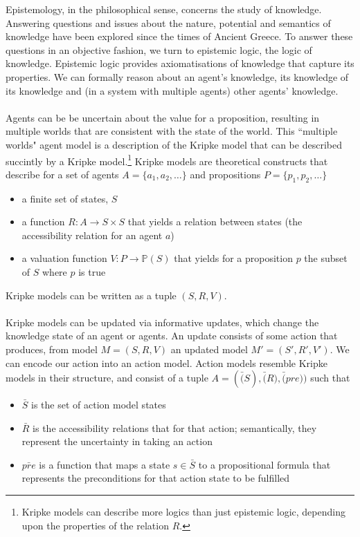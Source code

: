 \documentclass[12pt, a4paper]{article}
\begin{document}
Epistemology, in the philosophical sense, concerns the study of knowledge.
Answering questions and issues about the nature, potential and semantics of knowledge have been explored since the times of Ancient Greece.
To answer these questions in an objective fashion, we turn to epistemic logic, the logic of knowledge.
Epistemic logic provides axiomatisations of knowledge that capture its properties.
We can formally reason about an agent's knowledge, its knowledge of its knowledge and (in a system with multiple agents) other agents' knowledge.\\
\\
Agents can be be uncertain about the value for a proposition, resulting in multiple worlds that are consistent with the state of the world.
This ``multiple worlds" agent model is a description of the Kripke model that can be described succintly by a Kripke model.\footnote{Kripke models can describe more logics than just epistemic logic, depending upon the properties of the relation $R$.}
Kripke models are theoretical constructs that describe for a set of agents $A = \{a_1, a_2, \ldots\}$ and propositions $P = \{p_1, p_2, \ldots \}$
\begin{itemize}
  \item a finite set of states, $S$
  \item a function $R: A \to S \times S$ that yields a relation between states (the accessibility relation for an agent $a$)
  \item a valuation function $V: P \to \mathbb{P}(S)$ that yields for a proposition $p$ the subset of $S$ where $p$ is true
\end{itemize}
Kripke models can be written as a tuple $(S, R, V)$.\\
\\
Kripke models can be updated via informative updates, which change the knowledge state of an agent or agents.
An update consists of some action that produces, from model $M = (S, R, V)$ an updated model $M' = (S', R', V')$.
We can encode our action into an action model.
Action models resemble Kripke models in their structure, and consist of a tuple $A = (\bar(S), \bar(R), \bar(pre))$ such that
\begin{itemize}
  \item $\bar{S}$ is the set of action model states
  \item $\bar{R}$ is the accessibility relations that for that action; semantically, they represent the uncertainty in taking an action
  \item $\bar{pre}$ is a function that maps a state $s \in \bar{S}$ to a propositional formula that represents the preconditions for that action state to be fulfilled
\end{itemize}
\end{document}

